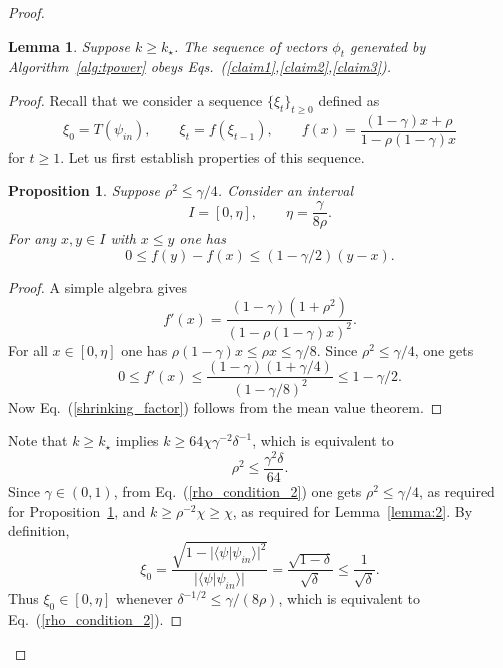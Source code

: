 \documentclass[
  reprint,            %
  amsmath,amssymb,
  aps,
  superscriptaddress, %
  longbibliography
]{revtex4-2}
\newtheorem{lemma}[theorem]{Lemma}
\newtheorem{prop}[theorem]{Proposition}
\theoremstyle{definition}
\newcommand{\la}{\langle}
\newcommand{\ra}{\rangle}
\newcommand{\be}{\begin{equation}}
\newcommand{\ee}{\end{equation}}
\begin{document}
\begin{proof}
\begin{lemma}
\label{lemma:3}
Suppose $k\ge k_\star$.
The sequence of vectors $\phi_t$ generated by
Algorithm~\ref{alg:tpower} obeys  Eqs.~(\ref{claim1},\ref{claim2},\ref{claim3}).
\end{lemma}
\begin{proof}
Recall that we consider a sequence $\{\xi_t\}_{t\ge 0}$ defined as
\[
\xi_0 = T(\psi_{in}), \qquad \xi_t = f(\xi_{t-1}), \qquad f(x)=\frac{(1-\gamma)x +\rho}{1-\rho(1-\gamma) x}
\]
for $t\ge 1$. Let us first establish properties of this sequence. 
\begin{prop}
\label{prop:Lip}
Suppose $\rho^2 \le \gamma/4$.
Consider an interval
\[
I= [0,\eta], \qquad \eta=\frac{\gamma}{8\rho}.
\]
For any  $x,y \in I$ with $x\le y$ one has
\be
\label{shrinking_factor}
0\le f(y)-f(x) \le  (1-\gamma/2) (y-x).
\ee
\end{prop}
\begin{proof}
A simple algebra gives
\[
f'(x)=\frac{(1-\gamma)(1+\rho^2)}{(1-\rho(1-\gamma)x)^2}.
\]
For all $x\in [0,\eta]$ one has $\rho(1-\gamma)x\le \rho x \le \gamma/8$.
Since $\rho^2\le \gamma/4$, one gets
\[
0\le f'(x)\le  \frac{(1-\gamma)(1+\gamma/4)}{(1-\gamma/8)^2}\le 1-\gamma/2.
\]
Now Eq.~(\ref{shrinking_factor}) follows from the mean value theorem.
\end{proof}
Note that $k\ge k_\star$ implies $k\ge 64 \chi \gamma^{-2} \delta^{-1}$, which 
is equivalent to 
\be
\label{rho_condition_2}
\rho^2 \le \frac{\gamma^2 \delta}{64}.
\ee
Since $\gamma \in (0,1)$, from
Eq.~(\ref{rho_condition_2})  one gets $\rho^2\le \gamma/4$, as required for Proposition~\ref{prop:Lip},
and  $k\ge \rho^{-2} \chi \ge \chi$, as required for Lemma~\ref{lemma:2}.
By definition, 
\be
\label{xi_0_vs_delta}
\xi_0 = \frac{\sqrt{1-|\la \psi|\psi_{in}\ra|^2}}{|\la \psi|\psi_{in}\ra|} = \frac{\sqrt{1-\delta}}{\sqrt{\delta}} \le \frac1{\sqrt{\delta}}.
\ee
Thus  $\xi_0\in [0,\eta]$ whenever  $\delta^{-1/2}\le \gamma/(8\rho)$, which is equivalent to Eq.~(\ref{rho_condition_2}).


\end{proof}
\end{proof}
\end{document}
